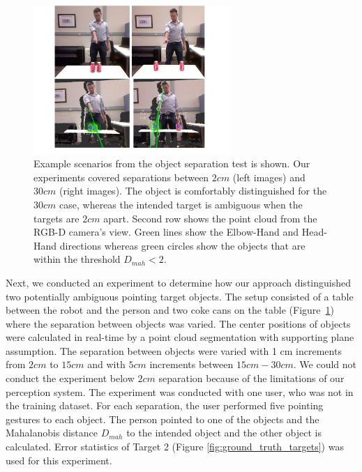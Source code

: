 \documentclass{tADR2e}
\begin{document}
\begin{figure}[ht!]
\centering
\includegraphics[width=75mm]{pics/separation_2_cropped}
\caption{Example scenarios from the object separation test is shown. Our experiments covered separations between $2cm$ (left images) and $30cm$ (right images). The object is comfortably distinguished for the $30cm$ case, whereas the intended target is ambiguous when the targets are $2cm$ apart. Second row shows the point cloud from the RGB-D camera's view. Green lines show the Elbow-Hand and Head-Hand directions whereas green circles show the objects that are within the threshold $D_{mah}<2$.}
\label{fig:separation}
\end{figure}


Next, we conducted an experiment to determine how our approach distinguished two potentially ambiguous pointing target objects. The setup consisted of a table between the robot and the person and two coke cans on the table (Figure~\ref{fig:separation}) where the separation between objects was varied. The center positions of objects were calculated in real-time by a point cloud segmentation with supporting plane assumption. The separation between objects were varied with 1 cm increments from $2 cm$ to $15 cm$ and with $5 cm$ increments between $15 cm-30 cm$. We could not conduct the experiment below $2 cm$ separation because of the limitations of our perception system. The experiment was conducted with one user, who was not in the training dataset. For each separation, the user performed five pointing gestures to each object. The person pointed to one of the objects and the Mahalanobis distance $D_{mah}$ to the intended object and the other object is calculated. Error statistics of Target 2 (Figure \ref{fig:ground_truth_targets}) was used for this experiment.
\end{document}
